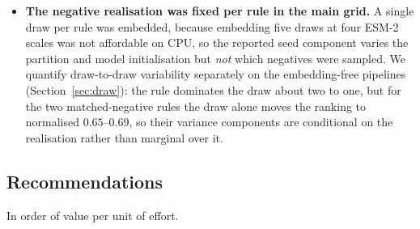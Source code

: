 \documentclass[11pt,a4paper]{article}
\begin{document}
\begin{itemize}[leftmargin=1.4em,itemsep=2pt]
  reviewed-UniProt entries (Section~\ref{sec:exposure}). That is an overlap audit against
  the \emph{current} release; ESM-2 was trained on UniRef from release 2021\_04, so our
  audit bounds exposure in neither direction, and we do not claim it does. Whether the
  encoder had seen these sequences remains untested.
\item \textbf{The negative realisation was fixed per rule in the main grid.} A single draw
  per rule was embedded, because embedding five draws at four ESM-2 scales was not
  affordable on CPU, so the reported seed component varies the partition and model
  initialisation but \emph{not} which negatives were sampled. We quantify draw-to-draw
  variability separately on the embedding-free pipelines
  (Section~\ref{sec:draw}): the rule dominates the draw about two to one, but for the two
  matched-negative rules the draw alone moves the ranking to normalised $0.65$--$0.69$, so
  their variance components are conditional on the realisation rather than marginal over it.
\end{itemize}

\subsection{Recommendations}

In order of value per unit of effort.
\end{document}
